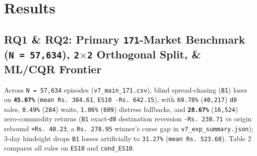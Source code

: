 \documentclass[11pt,a4paper]{article}
\begin{document}
\section{Results}

\subsection{RQ1 \& RQ2: Primary \texttt{171}-Market Benchmark (\texttt{N = 57,634}), \texttt{2$\times$2} Orthogonal Split, \& ML/CQR Frontier}

Across \texttt{N = 57,634} episodes (\texttt{v7\_main\_171.csv}), blind spread-chasing (\texttt{B1}) loses on \textbf{\texttt{45.07\%}} (\texttt{mean Rs.\,384.61}, \texttt{ES10 -Rs.\,642.15}), with \texttt{69.78\%} (\texttt{40,217}) \texttt{d0} sales, \texttt{0.49\%} (\texttt{284}) waits, \texttt{1.06\%} (\texttt{609}) distress fallbacks, and \textbf{\texttt{28.67\%}} (\texttt{16,524}) zero-commodity returns (\texttt{B1} exact-\texttt{d0} destination reversion \texttt{-Rs.\,238.71} vs origin rebound \texttt{+Rs.\,40.23}, a \texttt{Rs.\,278.95} winner's curse gap in \texttt{v7\_exp\_summary.json}); 3-day hindsight drops \texttt{B1} losses artificially to \texttt{31.27\%} (\texttt{mean Rs.\,523.68}). Table 2 compares all rules on \texttt{ES10} and \texttt{cond\_ES10}.
\end{document}
